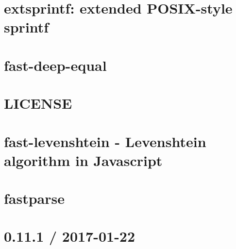 \documentclass[twoside]{book}
\newcommand{\+}{\discretionary{\mbox{\scriptsize$\hookleftarrow$}}{}{}}
\begin{document}
\chapter{extsprintf\+: extended P\+O\+S\+I\+X-\/style sprintf}
\label{md__c_1_workspace_demo_src_main_script_node_modules_extsprintf__r_e_a_d_m_e}

\chapter{fast-\/deep-\/equal}
\label{md__c_1_workspace_demo_src_main_script_node_modules_fast-deep-equal__r_e_a_d_m_e}

\chapter{L\+I\+C\+E\+N\+SE}
\label{md__c_1_workspace_demo_src_main_script_node_modules_fast-levenshtein__l_i_c_e_n_s_e}

\chapter{fast-\/levenshtein -\/ Levenshtein algorithm in Javascript}
\label{md__c_1_workspace_demo_src_main_script_node_modules_fast-levenshtein__r_e_a_d_m_e}

\chapter{fastparse}
\label{md__c_1_workspace_demo_src_main_script_node_modules_fastparse__r_e_a_d_m_e}

\chapter{0.11.1 / 2017-\/01-\/22}
\label{md__c_1_workspace_demo_src_main_script_node_modules_faye-websocket__c_h_a_n_g_e_l_o_g}

\end{document}

